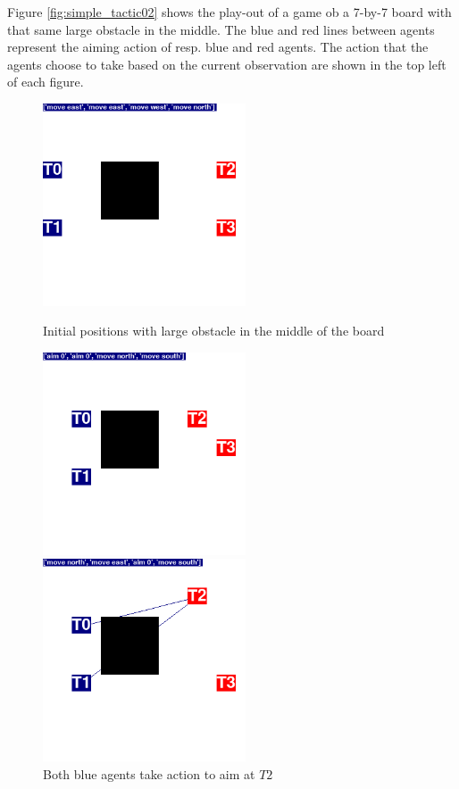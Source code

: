 Figure \ref{fig:simple_tactic02} shows the play-out of a game ob a 7-by-7 board with that same large obstacle in the middle. The blue and red lines between agents represent the aiming action of resp. blue and red agents. The action that the agents choose to take based on the current observation are shown in the top left of each figure.

\begin{figure}
\centering
\begin{minipage}{.45\textwidth}
  \centering
  \includegraphics[width=6cm]{images/iteration/screenshot01.png}
  \caption*{Initial positions with large obstacle in the middle of the board}
\end{minipage}%
\begin{minipage}{.1\textwidth}
\centering
  \caption*{ }
\end{minipage}%
\begin{minipage}{.45\textwidth}
  \centering
  \includegraphics[width=6cm]{images/iteration/screenshot02.png}
  \caption*{Both blue agents take action to aim at $T2$}
\end{minipage}
\centering
\begin{minipage}{.45\textwidth}
  \centering
  \includegraphics[width=6cm]{images/iteration/screenshot03.png}

\end{minipage}
\end{figure}
